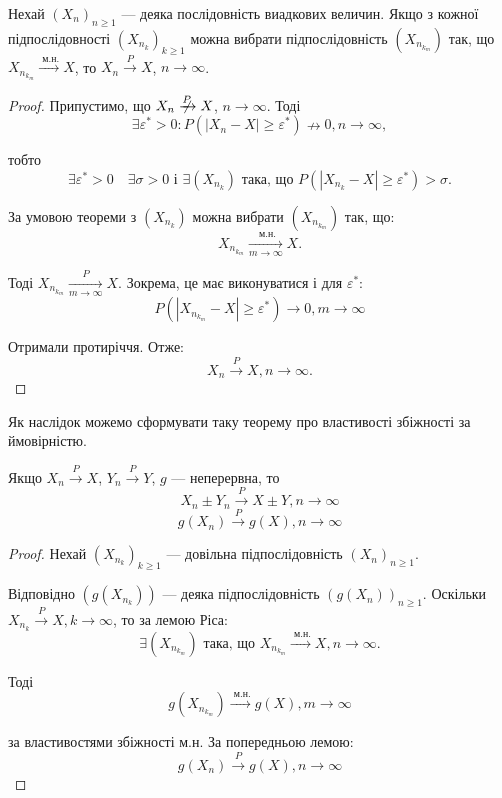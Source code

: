 \begin{lemma}
    Нехай $(X_n)_{n \geqslant 1}$ --- деяка послідовність
    виадкових величин.
    Якщо з кожної підпослідовності $(X_{n_k})_{k \geqslant 1}$
    можна вибрати підпослідовність $(X_{n_{k_m}})$
    так, що $X_{n_{k_m}} \xrightarrow{\text{ м.н.}} X$, то
    $X_{n} \xrightarrow{P} X$, $n \rightarrow \infty$.
\end{lemma}
\begin{proof}
    Припустимо, що $X_{n} \centernot{\xrightarrow{P}} X$, $n \rightarrow \infty$. 
    Тоді
    $$\exists \varepsilon^* > 0: P(|X_n - X| \geqslant \varepsilon^*) \nrightarrow 0, n \rightarrow \infty,$$
    
    тобто
    $$\exists \varepsilon^* > 0
    \quad \exists \sigma > 0 \text{ і } \exists (X_{n_k})
    \text{ така, що } P(|X_{n_k} - X| \geqslant \varepsilon^*) > \sigma.$$

    За умовою теореми з $(X_{n_k})$ можна вибрати $(X_{n_{k_m}})$ так, що:
    $$X_{n_{k_m}} \xrightarrow[m \rightarrow \infty]{\text{ м.н.}} X.$$
    
    Тоді $X_{n_{k_m}} \xrightarrow[m \rightarrow \infty]{P} X$.
    Зокрема, це має виконуватися і для $\varepsilon^*$:
    $$P(|X_{n_{k_m}} - X| \geqslant \varepsilon^*) \rightarrow 0, m \rightarrow \infty$$
    
    Отримали протиріччя. Отже:
    $$X_{n} \xrightarrow{P} X, n \rightarrow \infty.$$
\end{proof}

Як наслідок можемо сформувати таку теорему
про властивості збіжності за ймовірністю.

\begin{theorem}
    Якщо $X_{n} \xrightarrow{P} X$, $Y_{n} \xrightarrow{P} Y$,
    $g$ --- неперервна, то
    $$X_n \pm Y_n \xrightarrow{P} X \pm Y, n \rightarrow \infty$$
    $$g(X_n) \xrightarrow{P} g(X), n \rightarrow \infty$$
\end{theorem}
\begin{proof}
    Нехай $(X_{n_k})_{k \geqslant 1}$ --- довільна
    підпослідовність $(X_n)_{n \geqslant 1}$.

    Відповідно $(g(X_{n_k}))$ --- деяка підпослідовність
    $(g(X_{n}))_{n \geqslant 1}$.
    Оскільки $X_{n_k} \xrightarrow{P} X, k \rightarrow \infty$,
    то за лемою Ріса:
    $$\exists (X_{n_{k_m}}) \text{ така, що }
        X_{n_{k_m}} \xrightarrow{\text{ м.н.}} X, n \rightarrow \infty.$$

    Тоді
    $$g(X_{n_{k_m}}) \xrightarrow{\text{ м.н.}} g(X), m \rightarrow \infty$$

    за властивостями збіжності м.н. 
    За попередньою лемою:
    $$g(X_{n}) \xrightarrow{P} g(X), n \rightarrow \infty$$
\end{proof}


